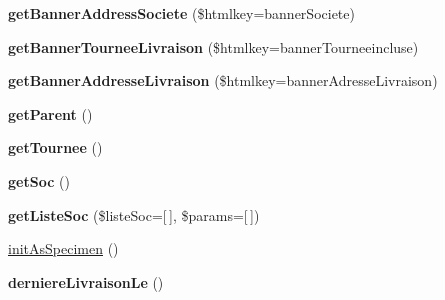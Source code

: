 \begin{DoxyCompactItemize}
{\bfseries get\+Banner\+Address\+Societe} (\$htmlkey=\textquotesingle{}banner\+Societe\textquotesingle{})
\item 
\mbox{\label{classTourneeGeneric__lines_a5c628ae5675ac017e7b641d972e2663e}} 
{\bfseries get\+Banner\+Tournee\+Livraison} (\$htmlkey=\textquotesingle{}banner\+Tourneeincluse\textquotesingle{})
\item 
\mbox{\label{classTourneeGeneric__lines_aa026642a038cc4f1ca8ed840991c3de6}} 
{\bfseries get\+Banner\+Addresse\+Livraison} (\$htmlkey=\textquotesingle{}banner\+Adresse\+Livraison\textquotesingle{})
\item 
\mbox{\label{classTourneeGeneric__lines_a6a3b2e59bcbcfd585b7d37c5cd083e95}} 
{\bfseries get\+Parent} ()
\item 
\mbox{\label{classTourneeGeneric__lines_a7ee1de220c7eea10c4cb771a1e0b4af6}} 
{\bfseries get\+Tournee} ()
\item 
\mbox{\label{classTourneeGeneric__lines_aa664a0cb8c3d80956bd03f53adb7c67c}} 
{\bfseries get\+Soc} ()
\item 
\mbox{\label{classTourneeGeneric__lines_a57359d8a4d03e506e1a4451a033b90e2}} 
{\bfseries get\+Liste\+Soc} (\$liste\+Soc=\mbox{[}$\,$\mbox{]}, \$params=\mbox{[}$\,$\mbox{]})
\item 
\hyperlink{classTourneeGeneric__lines_a0acc06c36a88f739608ff2f76000ea9f}{init\+As\+Specimen} ()
\item 
\mbox{\label{classTourneeGeneric__lines_a0d45094240468207229e1eefb45aea16}} 
{\bfseries derniere\+Livraison\+Le} ()
\end{DoxyCompactItemize}
